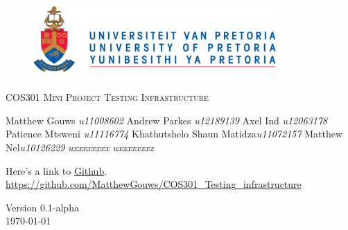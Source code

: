 \begin{titlepage}
	\begin{center}
		
		\begin{figure}[t]
			\centering
			\includegraphics[width=350px]{UP_Logo.png}
		\end{figure}
		
		\textsc{\LARGE COS301 Mini Project Testing \newline\newline Infrastructure}
		
		\begin{flushright} \large
			Matthew Gouws \emph{u11008602} \newline
			Andrew Parkes \emph{u12189139} \newline
			 Axel Ind \emph{u12063178} \newline
			 Patience Mtsweni \emph{u11116774} \newline
			 Khathutshelo Shaun Matidza\emph{u11072157} \newline
			 Matthew Nel\emph{u10126229} \newline
			 \emph{uxxxxxxxx} \newline
			 \emph{uxxxxxxxx} \newline
		\end{flushright}
		
		\vfill
		
	Here's a link to \href{https://github.com/MatthewGouws/COS301_Testing_infrastructure}{Github}.\\
	\url{https://github.com/MatthewGouws/COS301_Testing_infrastructure}

	\vfill

	{\large Version 0.1-alpha}
	\\
	{\large \today}		
		
		
	\end{center}
\end{titlepage}

